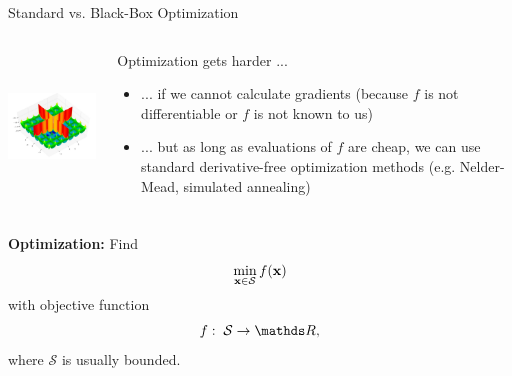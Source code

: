 \documentclass[11pt,compress,t,notes=noshow, xcolor=table]{beamer}
\begin{document}
\begin{vbframe}{Standard vs. Black-Box Optimization}
\begin{columns}
\begin{column}{0.4\textwidth}
\begin{center}
\includegraphics[height = 4cm]{figure_man/cross-in-tray.jpg}
\end{center}
\end{column}
\begin{column}{0.59\textwidth}
Optimization gets harder ...
\begin{itemize}
\item ... if we cannot calculate gradients (because $f$ is not differentiable or $f$ is not known to us)
\item ... but as long as evaluations of $f$ are cheap, we can use standard derivative-free optimization methods (e.g. Nelder-Mead, simulated annealing)
\end{itemize}
\end{column}
\end{columns}

\framebreak 

\textbf{Optimization: } Find
$$
\min_{\mathbf{x} \in \mathcal{S}} f(\mathbf{x})
$$
with objective function
$$
f: \; \mathcal{S} \to \R,
$$
where $\mathcal{S}$ is usually bounded.

\lz 

\begin{columns}
\begin{column}{0.4\textwidth}

\vspace*{-0.8cm}




\end{column}
\end{columns}
\end{vbframe}
\end{document}
